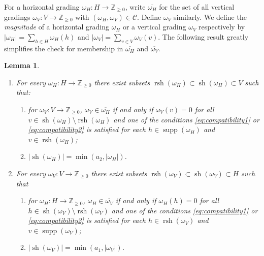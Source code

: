 \documentclass{amsart}
\newtheorem{lemma}[theorem]{Lemma}
\newcommand{\cC}{\mathcal{C}}
\newcommand{\ZZ}{\mathbb{Z}}
\newcommand{\supp}{\operatorname{supp}}
\newcommand{\rsh}{\operatorname{rsh}}
\newcommand{\sh}{\operatorname{sh}}
\newenvironment{enumeratea}{\begin{enumerate}[\upshape (a)]}
                           {\end{enumerate}}
\newenvironment{enumeratei}{\begin{enumerate}[\upshape (i)]}
                           {\end{enumerate}}
\begin{document}
 For a horizontal grading $\omega_H:H\to\ZZ_{\ge0}$, write $\overline{\omega_H}$ for the set of all vertical gradings $\omega_V:V\to\ZZ_{\ge0}$ with $(\omega_H,\omega_V)\in\cC$.  Define $\overline{\omega_V}$ similarly.  We define the \emph{magnitude} of a horizontal grading $\omega_H$ or a vertical grading $\omega_V$ respectively by $|\omega_H|=\sum\limits_{h\in H}\omega_H(h)$ and $|\omega_V|=\sum\limits_{v\in V} \omega_V(v)$.  The following result greatly simplifies the check for membership in $\overline{\omega_H}$ and $\overline{\omega_V}$.
 \begin{lemma}\label{le:shadows}\mbox{}
  \begin{enumeratea}
   \item For every $\omega_H:H\to\ZZ_{\ge0}$ there exist subsets $\rsh(\omega_H)\subset\sh(\omega_H)\subset V$ such that:
   \begin{enumeratei}
    \item for $\omega_V:V\to\ZZ_{\ge0}$, $\omega_V\in\overline{\omega_H}$ if and only if $\omega_V(v)=0$ for all $v\in\sh(\omega_H)\setminus\rsh(\omega_H)$ and one of the conditions \eqref{eq:compatibility1} or \eqref{eq:compatibility2} is satisfied for each $h\in\supp(\omega_H)$ and $v\in\rsh(\omega_H)$;
    \item $|\sh(\omega_H)|=\min(a_2,|\omega_H|)$.
   \end{enumeratei}
   \item For every $\omega_V:V\to\ZZ_{\ge0}$ there exist subsets $\rsh(\omega_V)\subset\sh(\omega_V)\subset H$ such that
   \begin{enumeratei}
    \item for $\omega_H:H\to\ZZ_{\ge0}$, $\omega_H\in\overline{\omega_V}$ if and only if $\omega_H(h)=0$ for all $h\in\sh(\omega_V)\setminus\rsh(\omega_V)$ and one of the conditions \eqref{eq:compatibility1} or \eqref{eq:compatibility2} is satisfied for each $h\in\rsh(\omega_V)$ and $v\in\supp(\omega_V)$;
    \item $|\sh(\omega_V)|=\min(a_1,|\omega_V|)$.
   \end{enumeratei}
  \end{enumeratea}
 \end{lemma}
\end{document}
